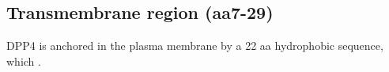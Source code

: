 \subsection{Transmembrane region (aa7-29)}

DPP4 is anchored in the plasma membrane by a 22 aa hydrophobic sequence, which . \cite{Hong_1990}